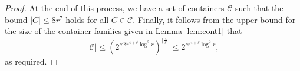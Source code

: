 \documentclass[10pt,a4paper]{amsart}
\newcommand{\cC}{\mathcal{C}}
\begin{document}
\begin{proof}
    At the end of this process, we have a set of containers $\cC$ such that the bound $|C| \leq 8r^7$ holds for all $C \in \cC$. Finally, it follows from the upper bound for the size of the container families given in Lemma \ref{lem:cont1} that
    \[
    |\cC| \leq \left(2^{c'\delta r^{4+\delta} \log^2 r} \right)^{\lceil \frac{4}{\delta}\rceil } \leq  2^{cr^{4+\delta} \log^2 r},
    \]
as required.
\end{proof}
\end{document}

